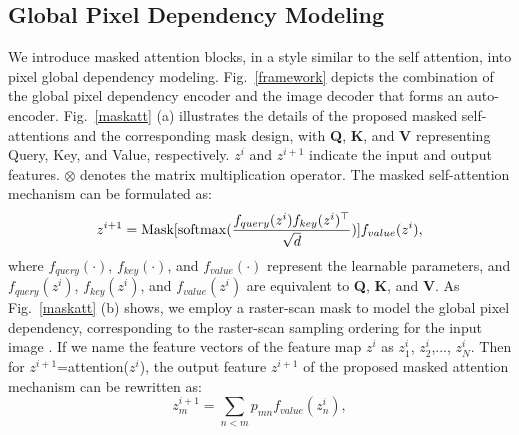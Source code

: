 \documentclass[10pt,journal,compsoc]{IEEEtran}
\begin{document}
 
 
 


\subsection{Global Pixel Dependency Modeling}
We introduce masked attention blocks, in a style similar to the self attention, into pixel global dependency modeling. Fig.~\ref{framework} depicts the combination of the global pixel dependency encoder and the image decoder that forms an auto-encoder. Fig.~\ref{maskatt} (a) illustrates the details of the proposed masked self-attentions and the corresponding mask design, with \textbf{Q}, \textbf{K}, and \textbf{V} representing Query, Key, and Value, respectively. $z^{i}$ and $z^{i+1}$ indicate the input and output features. $\otimes$ denotes the matrix multiplication operator. The masked self-attention mechanism can be formulated as:  
\begin{equation}
     z^{i+1} = {\textbf{\rm Mask}} [{\rm softmax}(\frac{f_{query}(z^{i})f_{key}(z^{i})^\top} {\sqrt{d}})]f_{value}(z^{i}),
\end{equation}
where $f_{query}(\cdot)$, $f_{key}(\cdot)$, and $f_{value}(\cdot)$ represent the learnable parameters, and ${f_{query}(z^{i})}$, ${f_{key}(z^{i})}$, and ${f_{value}(z^{i})}$ are equivalent to \textbf{Q}, \textbf{K}, and \textbf{V}. As Fig.~\ref{maskatt} (b) shows, we employ a raster-scan mask to model the global pixel dependency, corresponding to the raster-scan sampling ordering for the input image \cite{ouali2020autoregressive}. If we name the feature vectors of the feature map $z^{i}$ as $z^{i}_{1}$, $z^{i}_{2}$,..., $z^{i}_{N}$. Then for $z^{i+1}$=attention($z^{i}$), the output feature $z^{i+1}$ of the proposed masked attention mechanism can be rewritten as:  
\begin{equation}
     z^{i+1}_{m} = \sum_{n<m} p_{mn} f_{value}(z^{i}_{n}),
\end{equation}
\end{document}
